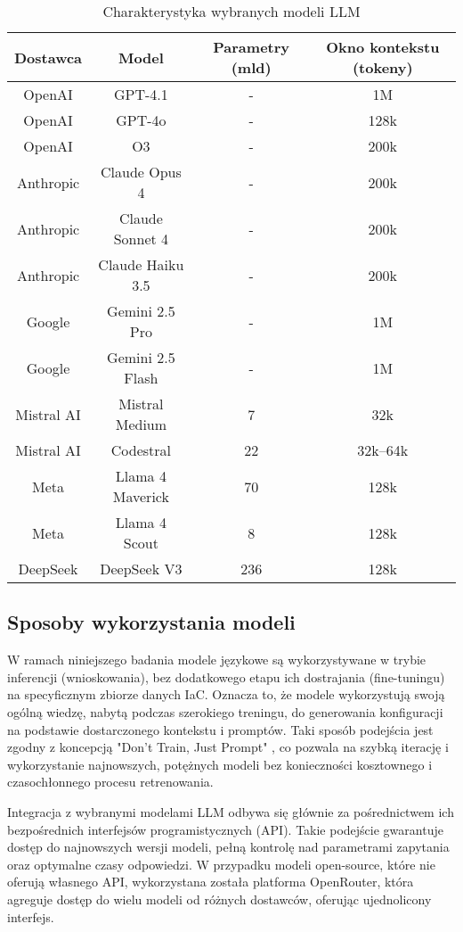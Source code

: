 \begin{table}[!h] \centering
\caption{Charakterystyka wybranych modeli LLM}
\label{tab:llm-characteristic}
\begin{tabular}{| c | c | c | c |} \hline
\textbf{Dostawca} & \textbf{Model} & \textbf{Parametry (mld)} & \textbf{Okno kontekstu (tokeny)} \\ \hline\hline
OpenAI & GPT-4.1 & - & 1M \\ \hline
OpenAI & GPT-4o & - & 128k \\ \hline
OpenAI & O3 & - & 200k \\ \hline
Anthropic & Claude Opus 4 & - & 200k \\ \hline
Anthropic & Claude Sonnet 4 & - & 200k \\ \hline
Anthropic & Claude Haiku 3.5 & - & 200k \\ \hline
Google & Gemini 2.5 Pro & - & 1M \\ \hline
Google & Gemini 2.5 Flash & - & 1M \\ \hline
Mistral AI & Mistral Medium & 7 & 32k \\ \hline
Mistral AI & Codestral & 22 & 32k–64k \\ \hline
Meta & Llama 4 Maverick & 70 & 128k \\ \hline
Meta & Llama 4 Scout & 8 & 128k \\ \hline
DeepSeek & DeepSeek V3 & 236 & 128k \\ \hline
\end{tabular}
\end{table}

\subsection{Sposoby wykorzystania modeli}

W ramach niniejszego badania modele językowe są wykorzystywane w trybie inferencji (wnioskowania), bez dodatkowego etapu ich dostrajania (fine-tuningu) na specyficznym zbiorze danych IaC. Oznacza to, że modele wykorzystują swoją ogólną wiedzę, nabytą podczas szerokiego treningu, do generowania konfiguracji na podstawie dostarczonego kontekstu i promptów. Taki sposób podejścia jest zgodny z koncepcją "Don't Train, Just Prompt" \cite{kratzke_dont_2024}, co pozwala na szybką iterację i wykorzystanie najnowszych, potężnych modeli bez konieczności kosztownego i czasochłonnego procesu retrenowania.

Integracja z wybranymi modelami LLM odbywa się głównie za pośrednictwem ich bezpośrednich interfejsów programistycznych (API). Takie podejście gwarantuje dostęp do najnowszych wersji modeli, pełną kontrolę nad parametrami zapytania oraz optymalne czasy odpowiedzi. W przypadku modeli open-source, które nie oferują własnego API, wykorzystana została platforma OpenRouter, która agreguje dostęp do wielu modeli od różnych dostawców, oferując ujednolicony interfejs.

